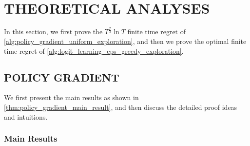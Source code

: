 \section{THEORETICAL ANALYSES}
\label{sec:theoretical_analyses}

In this section, we first prove the $T^{\frac{2}{3}}\ln{T}$ finite time regret of \cref{alg:policy_gradient_uniform_exploration}, and then we prove the optimal finite time regret of \cref{alg:logit_learning_eps_greedy_exploration}.

\subsection{POLICY GRADIENT}
\label{subsec:theoretical_analyses_policy_gradient}

We first present the main results as shown in \cref{thm:policy_gradient_main_result}, and then discuss the detailed proof ideas and intuitions.

\subsubsection{Main Results}
\label{subsubsec:main_results_policy_gradient}

